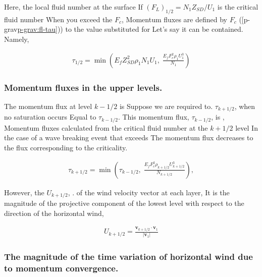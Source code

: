Here, the local fluid number at the surface If
\((F_L)_{1/2} = N_1 Z_{SD}/U_1\) is the critical fluid number When you
exceed the \(F_c\), Momentum fluxes are defined by \(F_c\)
({[}p-grav\protect\hyperlink{p-ux5cux2520grav:fl-tau}{p-grav:fl-tau{]}}))
to the value substituted for Let's say it can be contained. Namely,

\begin{eqnarray}
  \tau_{1/2} = \min \left(
                   E_f Z_{SD}^{2} \rho_1 N_1 U_1, \; 
                  \frac{E_f F_c^{2} \rho_1 U_1^3}{N_1}
               \right)
\end{eqnarray}

\hypertarget{momentum-fluxes-in-the-upper-levels.}{%
\subsubsection{Momentum fluxes in the upper
levels.}\label{momentum-fluxes-in-the-upper-levels.}}

The momentum flux at level \(k-1/2\) is Suppose we are required to.
\(\tau_{k+1/2}\), when no saturation occurs Equal to \(\tau_{k-1/2}\).
This momentum flux, \(\tau_{k-1/2}\), is , Momentum fluxes calculated
from the critical fluid number at the \(k+1/2\) level In the case of a
wave breaking event that exceeds The momentum flux decreases to the flux
corresponding to the criticality.

\begin{eqnarray}
  \tau_{k+1/2} = \min \left( 
               \tau_{k-1/2}, \;
               \frac{E_f F_c^2 \rho_{k+1/2} U_{k+1/2}^3}{N_{k+1/2}}
                      \right),
\end{eqnarray}

However, the \(U_{k+1/2}\), . of the wind velocity vector at each layer,
It is the magnitude of the projective component of the lowest level with
respect to the direction of the horizontal wind,

\begin{eqnarray}
  U_{k+1/2} = \frac{{\mathbf v}_{k+1/2} 
                      \cdot {\mathbf v}_{1}}
                   {|{\mathbf v}_{1}|       }
\end{eqnarray}

\hypertarget{the-magnitude-of-the-time-variation-of-horizontal-wind-due-to-momentum-convergence.}{%
\subsubsection{The magnitude of the time variation of horizontal wind
due to momentum
convergence.}\label{the-magnitude-of-the-time-variation-of-horizontal-wind-due-to-momentum-convergence.}}

